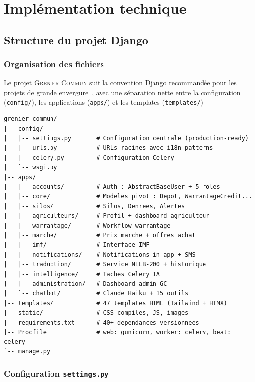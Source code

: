 \documentclass[12pt,a4paper,twoside]{report}
\newcommand{\gc}{\textsc{Grenier Commun}}
\begin{document}
\chapter{Implémentation technique}

\section{Structure du projet Django}

\subsection{Organisation des fichiers}

Le projet \gc{} suit la convention Django recommandée pour les projets
de grande envergure~\cite{holovaty2009django,django2024docs}, avec une
séparation nette entre la configuration (\texttt{config/}), les applications
(\texttt{apps/}) et les templates (\texttt{templates/}).

\begin{lstlisting}[style=bashstyle, caption={Arborescence du projet \gc{}}]
grenier_commun/
|-- config/
|   |-- settings.py       # Configuration centrale (production-ready)
|   |-- urls.py           # URLs racines avec i18n_patterns
|   |-- celery.py         # Configuration Celery
|   `-- wsgi.py
|-- apps/
|   |-- accounts/         # Auth : AbstractBaseUser + 5 roles
|   |-- core/             # Modeles pivot : Depot, WarrantageCredit...
|   |-- silos/            # Silos, Denrees, Alertes
|   |-- agriculteurs/     # Profil + dashboard agriculteur
|   |-- warrantage/       # Workflow warrantage
|   |-- marche/           # Prix marche + offres achat
|   |-- imf/              # Interface IMF
|   |-- notifications/    # Notifications in-app + SMS
|   |-- traduction/       # Service NLLB-200 + historique
|   |-- intelligence/     # Taches Celery IA
|   |-- administration/   # Dashboard admin GC
|   `-- chatbot/          # Claude Haiku + 15 outils
|-- templates/            # 47 templates HTML (Tailwind + HTMX)
|-- static/               # CSS compiles, JS, images
|-- requirements.txt      # 40+ dependances versionnees
|-- Procfile              # web: gunicorn, worker: celery, beat: celery
`-- manage.py
\end{lstlisting}

\subsection{Configuration \texttt{settings.py}}
\end{document}
